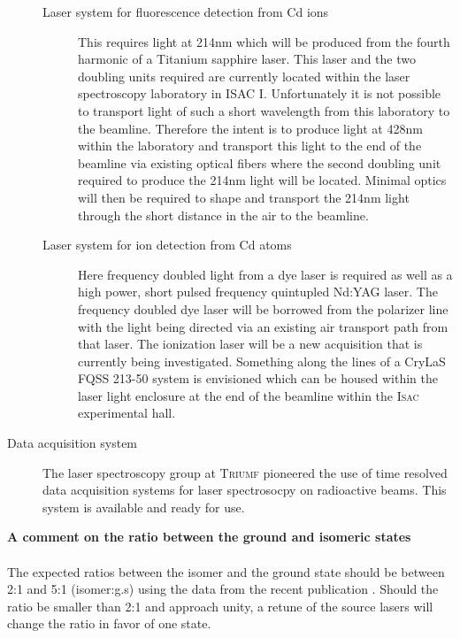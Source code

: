 \documentclass[12pt]{article}
\begin{document}
\begin{description}
\begin{description}

\item [Laser system for fluorescence detection from Cd ions] This requires light at 214nm which will be produced from the fourth harmonic of a Titanium sapphire laser. This laser and the two doubling units required are currently located within the laser spectroscopy laboratory in ISAC I. Unfortunately it is not possible to transport light of such a short wavelength from this laboratory to the beamline. Therefore the intent is to produce light at 428nm within the laboratory and transport this light to the end of the beamline via existing optical fibers where the second doubling unit required to produce the 214nm light will be located. Minimal optics will then be required to shape and transport the 214nm light through the short distance in the air to the beamline.

\item [Laser system for ion detection from Cd atoms] Here frequency doubled light from a dye laser is required as well as a high power, short pulsed frequency quintupled Nd:YAG laser.  The frequency doubled dye laser will be borrowed from the polarizer line with the light being directed via an existing air transport path from that laser. The ionization laser will be a new acquisition that is currently being investigated. Something along the lines of a CryLaS FQSS 213-50 system is envisioned which can be housed within the laser light enclosure at the end of the beamline within the \textsc{Isac} experimental hall.

\end{description}

\item [Data acquisition system] The laser spectroscopy group at \textsc{Triumf} pioneered the use of time resolved data acquisition systems for laser spectrosocpy on radioactive beams. This system is available and ready for use.

\end{description}

\textbf{A comment on the ratio between the ground and isomeric states}\\
\\
The expected ratios between the isomer and the ground state should be between 2:1 and 5:1 (isomer:g.s) using the data from the recent publication \cite{Lascar2017}. Should the ratio be smaller than 2:1 and approach unity, a retune of the source lasers will change the ratio in favor of one state.
\end{document}

